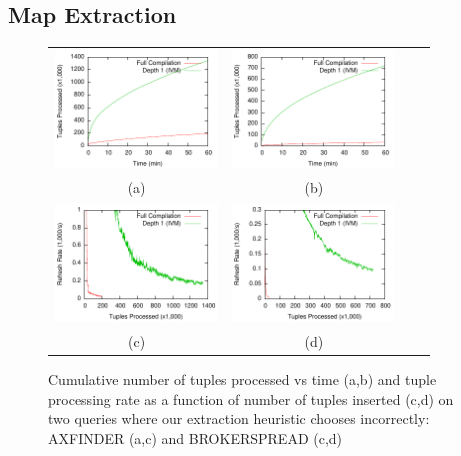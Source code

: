 \subsection{Map Extraction} 
\begin{figure}
\begin{center}
\hspace*{-0.2in}
\begin{tabular}{cccc}
\includegraphics[width=1.7in]{../graphs/graphs/time_axfinder.pdf} &
\includegraphics[width=1.7in]{../graphs/graphs/time_brokerspread.pdf} \\
(a) & (b) \\
\includegraphics[width=1.7in]{../graphs/graphs/windowedrate_axfinder.pdf} &
\includegraphics[width=1.7in]{../graphs/graphs/windowedrate_brokerspread.pdf} \\
(c) & (d) \\
\end{tabular}
\caption{Cumulative number of tuples processed vs time (a,b) and tuple processing rate as a function of number of tuples inserted (c,d) on two queries where our extraction heuristic chooses incorrectly: AXFINDER (a,c) and BROKERSPREAD (c,d)}
\label{fig:experiments:extraction}
\end{center}
\end{figure}

